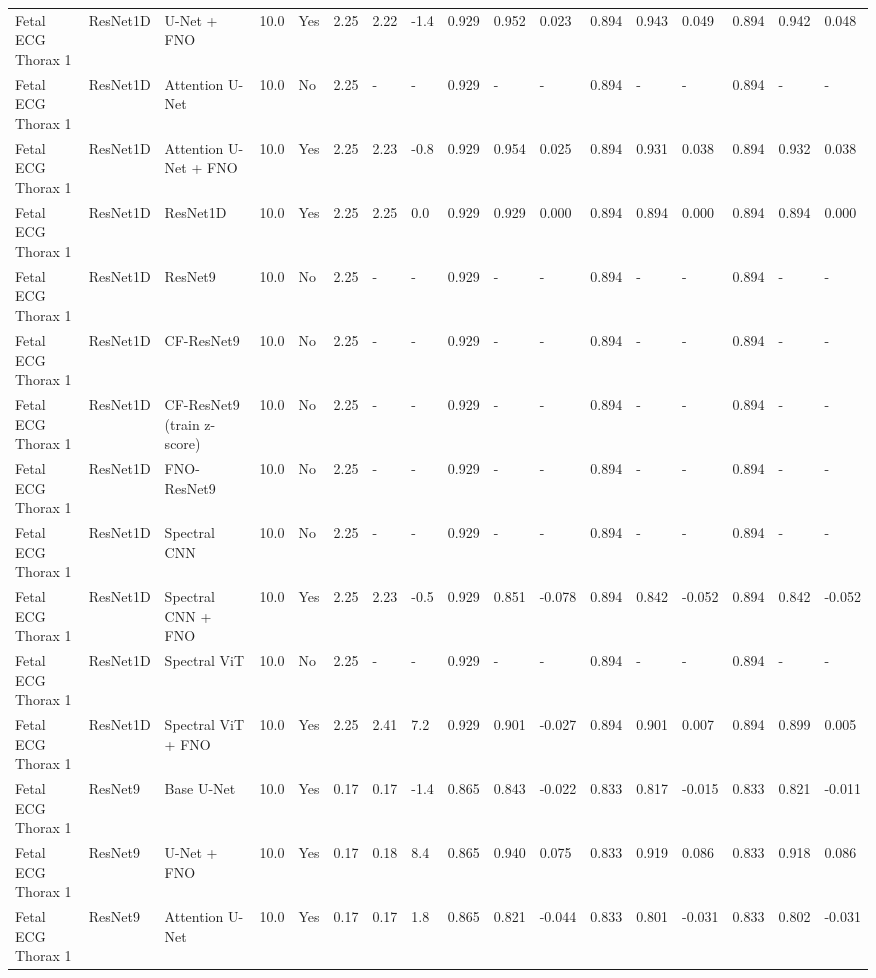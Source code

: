 \begin{longtable}{lllllllllllllllll}
Fetal ECG Thorax 1 & ResNet1D & U-Net + FNO & 10.0 & Yes & 2.25 & 2.22 & -1.4 & 0.929 & 0.952 & 0.023 & 0.894 & 0.943 & 0.049 & 0.894 & 0.942 & 0.048 \\
Fetal ECG Thorax 1 & ResNet1D & Attention U-Net & 10.0 & No & 2.25 & - & - & 0.929 & - & - & 0.894 & - & - & 0.894 & - & - \\
Fetal ECG Thorax 1 & ResNet1D & Attention U-Net + FNO & 10.0 & Yes & 2.25 & 2.23 & -0.8 & 0.929 & 0.954 & 0.025 & 0.894 & 0.931 & 0.038 & 0.894 & 0.932 & 0.038 \\
Fetal ECG Thorax 1 & ResNet1D & ResNet1D & 10.0 & Yes & 2.25 & 2.25 & 0.0 & 0.929 & 0.929 & 0.000 & 0.894 & 0.894 & 0.000 & 0.894 & 0.894 & 0.000 \\
Fetal ECG Thorax 1 & ResNet1D & ResNet9 & 10.0 & No & 2.25 & - & - & 0.929 & - & - & 0.894 & - & - & 0.894 & - & - \\
Fetal ECG Thorax 1 & ResNet1D & CF-ResNet9 & 10.0 & No & 2.25 & - & - & 0.929 & - & - & 0.894 & - & - & 0.894 & - & - \\
Fetal ECG Thorax 1 & ResNet1D & CF-ResNet9 (train z-score) & 10.0 & No & 2.25 & - & - & 0.929 & - & - & 0.894 & - & - & 0.894 & - & - \\
Fetal ECG Thorax 1 & ResNet1D & FNO-ResNet9 & 10.0 & No & 2.25 & - & - & 0.929 & - & - & 0.894 & - & - & 0.894 & - & - \\
Fetal ECG Thorax 1 & ResNet1D & Spectral CNN & 10.0 & No & 2.25 & - & - & 0.929 & - & - & 0.894 & - & - & 0.894 & - & - \\
Fetal ECG Thorax 1 & ResNet1D & Spectral CNN + FNO & 10.0 & Yes & 2.25 & 2.23 & -0.5 & 0.929 & 0.851 & -0.078 & 0.894 & 0.842 & -0.052 & 0.894 & 0.842 & -0.052 \\
Fetal ECG Thorax 1 & ResNet1D & Spectral ViT & 10.0 & No & 2.25 & - & - & 0.929 & - & - & 0.894 & - & - & 0.894 & - & - \\
Fetal ECG Thorax 1 & ResNet1D & Spectral ViT + FNO & 10.0 & Yes & 2.25 & 2.41 & 7.2 & 0.929 & 0.901 & -0.027 & 0.894 & 0.901 & 0.007 & 0.894 & 0.899 & 0.005 \\
Fetal ECG Thorax 1 & ResNet9 & Base U-Net & 10.0 & Yes & 0.17 & 0.17 & -1.4 & 0.865 & 0.843 & -0.022 & 0.833 & 0.817 & -0.015 & 0.833 & 0.821 & -0.011 \\
Fetal ECG Thorax 1 & ResNet9 & U-Net + FNO & 10.0 & Yes & 0.17 & 0.18 & 8.4 & 0.865 & 0.940 & 0.075 & 0.833 & 0.919 & 0.086 & 0.833 & 0.918 & 0.086 \\
Fetal ECG Thorax 1 & ResNet9 & Attention U-Net & 10.0 & Yes & 0.17 & 0.17 & 1.8 & 0.865 & 0.821 & -0.044 & 0.833 & 0.801 & -0.031 & 0.833 & 0.802 & -0.031 \\

\end{longtable}
